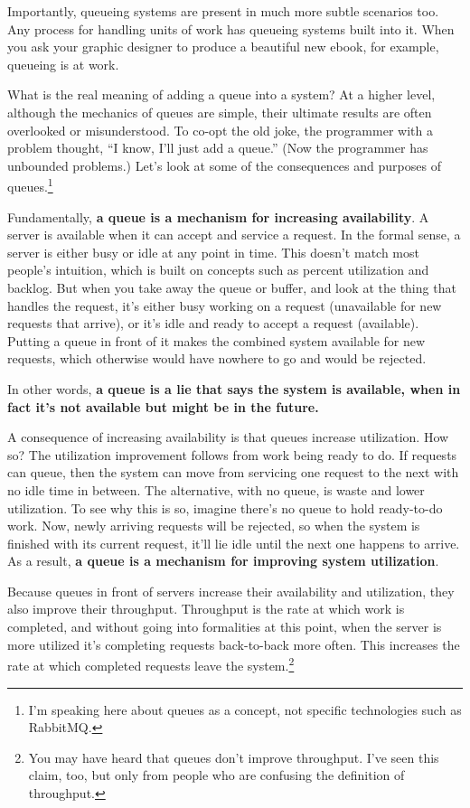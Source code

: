 \documentclass{vivid_layout}
\begin{document}
Importantly, queueing systems are present in much more subtle scenarios too. Any process for handling units of work has queueing systems built into it. When you ask your graphic designer to produce a beautiful new ebook, for example, queueing is at work.

What is the real meaning of adding a queue into a system?  At a higher level,
although the mechanics of queues are simple, their ultimate results are often
overlooked or misunderstood. To co-opt the old joke, the programmer with a
problem thought, ``I know, I'll just add a queue.'' (Now the programmer has
unbounded problems.) Let's look at some of the consequences and purposes of
queues.\footnote{I'm speaking here about queues as a concept, not specific technologies
such as RabbitMQ.}

Fundamentally, {\bfseries a queue is a mechanism for increasing availability}. A
server is available when it can accept and service a request. In the formal
sense, a server is either busy or idle at any point in time. This doesn't match
most people's intuition, which is built on concepts such as percent utilization
and backlog. But when you take away the queue or buffer, and look at the thing
that handles the request, it's either busy working on a request (unavailable for
new requests that arrive), or it's idle and ready to accept a request
(available).  Putting a queue in front of it makes the combined system available
for new requests, which otherwise would have nowhere to go and would be
rejected.

In other words, {\bfseries a queue is a lie that says the system is available,
when in fact it's not available but might be in the future.}

A consequence of increasing availability is that queues increase utilization.
How so? The utilization improvement follows from work being ready to do. If
requests can queue, then the system can move from servicing one request to the
next with no idle time in between. The alternative, with no queue, is waste and
lower utilization. To see why this is so, imagine there's no queue to hold
ready-to-do work. Now, newly arriving requests will be rejected, so when the
system is finished with its current request, it'll lie idle until the next one
happens to arrive.  As a result, {\bfseries a queue is a mechanism for improving
system utilization}.

Because queues in front of servers increase their availability and utilization,
they also improve their throughput. Throughput is the rate at which work is
completed, and without going into formalities at this point, when the server is
more utilized it's completing requests back-to-back more often. This increases
the rate at which completed requests leave the system.\footnote{You may have
heard that queues don't improve throughput. I've seen this claim, too, but only
from people who are confusing the definition of throughput.}
\end{document}

